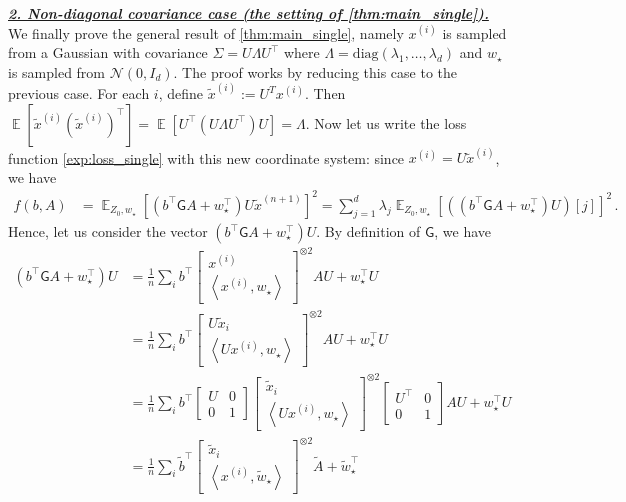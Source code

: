 \documentclass{article}
\DeclareMathOperator{\E}{\mathbb{E}}
\newcommand{\bb}{A}
\newcommand{\cc}{b}
\newcommand{\ttbb}{\widetilde{\bb}}
\newcommand{\ttcc}{\widetilde{\cc}}
\newcommand{\wstar}{w_\star}
\newcommand{\twstar}{\widetilde{w}_\star}
\newcommand{\tx}[1]{x^{(#1)}}
\newcommand{\ttx}[1]{\widetilde{x}^{(#1)}}
\newcommand{\MM}{\mathsf{G}}
\newcommand{\emphh}[1]{\textbf{\emph{#1}}}
\newcommand{\inp}[2]{\left \langle #1,#2\right\rangle}
\begin{document}
\underline{\emphh{2. Non-diagonal covariance case (the setting of \autoref{thm:main_single}).}}
We finally prove the general result of \autoref{thm:main_single}, namely  $\tx{i}$ is sampled from a Gaussian with covariance $\Sigma = U\Lambda U^\top$ where $\Lambda = \mathrm{diag}(\lambda_1,\dots, \lambda_d)$ and $\wstar$ is sampled  from $\mathcal{N}(0, I_d)$.  
The proof works by reducing this case to the previous case.
For each $i$, define $\ttx{i} :=  U^T\tx{i}$. Then $\E[\ttx{i}(\ttx{i})^\top ] = \E[U^\top (U\Lambda U^\top) U] = \Lambda$.
Now let us write the loss function \eqref{exp:loss_single} with this new coordinate system: since $\tx{i} = U \ttx{i}$, we have  
\begin{align}
f(\cc,\bb) &=  \E_{Z_0,\wstar} \left[(\cc^\top \MM \bb   + \wstar^\top) U\ttx{n+1} \right]^2 =\sum_{j=1}^d   \lambda_j \E_{Z_0,\wstar} \left[ \left((\cc^\top \MM \bb   + \wstar^\top) U\right) [j]  \right]^2 \,.
\end{align}
Hence, let us consider 
the vector $(\cc^\top \MM \bb   + \wstar^\top) U$. By definition of $\MM$, we have
\begin{align}
(\cc^\top \MM \bb   + \wstar^\top) U &= \frac{1}{n}\sum_i  \cc^\top \begin{bmatrix} \tx{i} \\
\inp{\tx{i}}{\wstar} \end{bmatrix}^{\otimes 2}  \bb U + \wstar^\top U\\
&=  \frac{1}{n}\sum_i  \cc^\top \begin{bmatrix} U\tilde{x}_i \\
\inp{U\tx{i}}{\wstar} \end{bmatrix}^{\otimes 2} \bb U+ \wstar^\top U\\
&=  \frac{1}{n}\sum_i  \cc^\top \begin{bmatrix}U & 0 \\0 & 1\end{bmatrix}\begin{bmatrix} \tilde{x}_i \\
\inp{U\tx{i}}{\wstar} \end{bmatrix}^{\otimes 2} \begin{bmatrix}U^\top & 0 \\0 & 1\end{bmatrix}\bb U+ \wstar^\top U \\
&= \frac{1}{n}\sum_i  \ttcc^\top  \begin{bmatrix} \tilde{x}_i \\
\inp{\tx{i}}{ \twstar} \end{bmatrix}^{\otimes 2} \ttbb + \twstar^\top 
\end{align}
\end{document}
